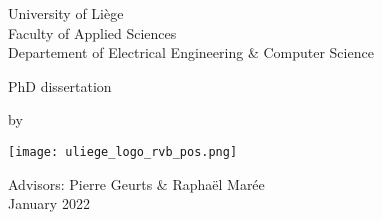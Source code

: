 \makeatletter


\begin{titlepage}

  \begin{center}
    {\Large University of Liège} \\
    \vspace{10pt}
    Faculty of Applied Sciences \\
    Departement of Electrical Engineering \& Computer Science

    \vfill 

    PhD dissertation 

    \vspace{2em}

    {
      \color{primary}
      \rm
      \bf
      \Huge
      \@title
    }

    \vspace{1em}

    by \@author

    \vfill


    \begin{minipage}{0.4\linewidth}
      \texttt{[image: uliege\_logo\_rvb\_pos.png]}
    \end{minipage}
    \begin{minipage}{0.55\linewidth}
      \begin{flushright}
        Advisors: Pierre Geurts \& Raphaël Marée \\
        January 2022
      \end{flushright}
    \end{minipage}

  \end{center}
\end{titlepage}

\restoregeometry 

\makeatother
